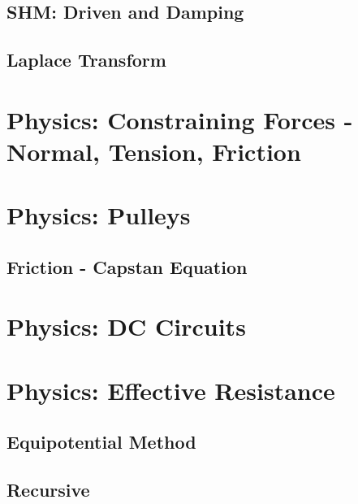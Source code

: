 \documentclass{article}
\begin{document}
\subsection{SHM: Driven and Damping}
\subsection{Laplace Transform}

\section{Physics: Constraining Forces - Normal, Tension, Friction}
\section{Physics: Pulleys}
\subsection{Friction - Capstan Equation}
\section{Physics: DC Circuits}
\section{Physics: Effective Resistance}
\subsection{Equipotential Method}
\subsection{Recursive}
\end{document}
